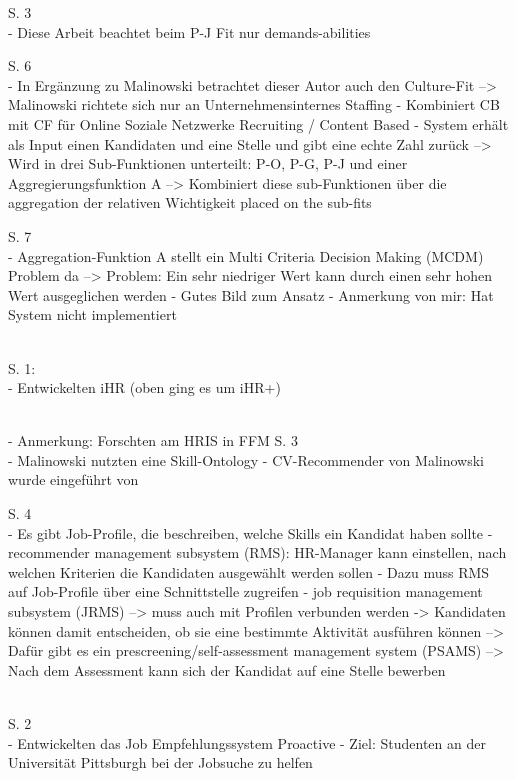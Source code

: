 S. 3\\
- Diese Arbeit beachtet beim P-J Fit nur demands-abilities

S. 6\\
- In Ergänzung zu Malinowski betrachtet dieser Autor auch den Culture-Fit --> Malinowski richtete sich nur an Unternehmensinternes Staffing
- Kombiniert CB mit CF für Online Soziale Netzwerke Recruiting / Content Based
- System erhält als Input einen Kandidaten und eine Stelle und gibt eine echte Zahl zurück --> Wird in drei Sub-Funktionen unterteilt: P-O, P-G, P-J und einer Aggregierungsfunktion A --> Kombiniert diese sub-Funktionen über die aggregation der relativen Wichtigkeit placed on the sub-fits

S. 7\\
- Aggregation-Funktion A stellt ein Multi Criteria Decision Making (MCDM) Problem da --> Problem: Ein sehr niedriger Wert kann durch einen sehr hohen Wert ausgeglichen werden
- Gutes Bild zum Ansatz
- Anmerkung von mir: Hat System nicht implementiert

\textcite{hong:2013}\\
S. 1:\\
- Entwickelten iHR (oben ging es um iHR+)

\textcite{laumer:2009}\\
- Anmerkung: Forschten am HRIS in FFM
S. 3\\
- Malinowski nutzten eine Skill-Ontology
- CV-Recommender von Malinowski wurde eingeführt von \textcite{faerber:2003}

S. 4\\
- Es gibt Job-Profile, die beschreiben, welche Skills ein Kandidat haben sollte
- recommender management subsystem (RMS): HR-Manager kann einstellen, nach welchen Kriterien die Kandidaten ausgewählt werden sollen
- Dazu muss RMS auf Job-Profile über eine Schnittstelle zugreifen
- job requisition management subsystem (JRMS) --> muss auch mit Profilen verbunden werden -> Kandidaten können damit entscheiden, ob sie eine bestimmte Aktivität ausführen können --> Dafür gibt es ein prescreening/self-assessment management system (PSAMS) --> Nach dem Assessment kann sich der Kandidat auf eine Stelle bewerben

\textcite{lee:2007}\\
S. 2\\
- Entwickelten das Job Empfehlungssystem Proactive
- Ziel: Studenten an der Universität Pittsburgh bei der Jobsuche zu helfen

